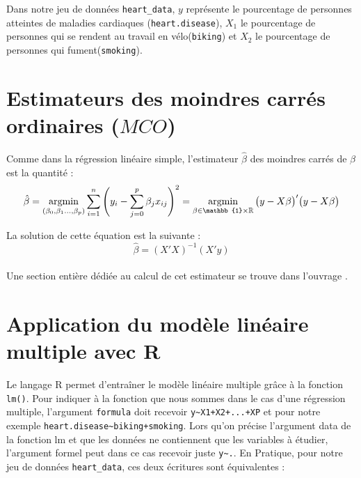 \documentclass[
]{book}
\begin{document}
Dans notre jeu de données \texttt{heart\_data}, \(y\) représente le pourcentage de personnes atteintes de maladies cardiaques (\texttt{heart.disease}), \(X_1\) le pourcentage de personnes qui se rendent au travail en vélo(\texttt{biking}) et \(X_2\) le pourcentage de personnes qui fument(\texttt{smoking}).

\hypertarget{estimateurs-des-moindres-carruxe9s-ordinaires-mco}{%
\section{\texorpdfstring{Estimateurs des moindres carrés ordinaires (\(MCO\))}{Estimateurs des moindres carrés ordinaires (MCO)}}\label{estimateurs-des-moindres-carruxe9s-ordinaires-mco}}

Comme dans la régression linéaire simple, l'estimateur \(\hat\beta\) des moindres carrés de \(\beta\) est la quantité :\\

\[
\hat\beta =\operatorname*{argmin}_{(\beta_0,\beta_1\dots,\beta_p)}
\sum\limits_{i=1}^{n}{\Bigg(y_i - \sum\limits_{j=0}^{p}\beta_jx_{ij}\Bigg)}^2\\ 
= \operatorname*{argmin}_{\beta \in \mathbb{1}\times\mathbb{R}}\big(y-X\beta\big)'\big(y-X\beta\big) 
\]

La solution de cette équation est la suivante :~
\[
\hat\beta = (X'X)^{-1}(X'y)
\]\\
Une section entière dédiée au calcul de cet estimateur se trouve dans l'ouvrage \citet{lm_simple}.

\hypertarget{application-du-moduxe8le-linuxe9aire-multiple-avec-r}{%
\section{Application du modèle linéaire multiple avec R}\label{application-du-moduxe8le-linuxe9aire-multiple-avec-r}}

Le langage R permet d'entraîner le modèle linéaire multiple grâce à la fonction \texttt{lm()}. Pour indiquer à la fonction que nous sommes dans le cas d'une régression multiple, l'argument \texttt{formula} doit recevoir \texttt{y\textasciitilde{}X1+X2+...+XP} et pour notre exemple \texttt{heart.disease\textasciitilde{}biking+smoking}.
Lors qu'on précise l'argument data de la fonction lm et que les données ne contiennent que les variables à étudier, l'argument formel peut dans ce cas recevoir juste \texttt{y\textasciitilde{}.}. En Pratique, pour notre jeu de données \texttt{heart\_data}, ces deux écritures sont équivalentes :
\end{document}
